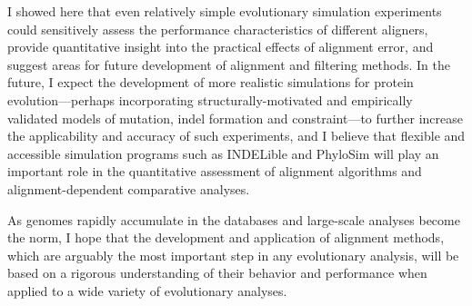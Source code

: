 
I showed here that even relatively simple evolutionary simulation
experiments could sensitively assess the performance characteristics
of different aligners, provide quantitative insight into the practical
effects of alignment error, and suggest areas for future development
of alignment and filtering methods. In the future, I expect the
development of more realistic simulations for protein
evolution---perhaps incorporating structurally-motivated and
empirically validated models of mutation, indel formation and
constraint---to further increase the applicability and accuracy of
such experiments, and I believe that flexible and accessible
simulation programs such as INDELible \citep{Fletcher2009INDELible}
and PhyloSim \citep{Sipos2011PhyloSim} will play an important role in
the quantitative assessment of alignment algorithms and
alignment-dependent comparative analyses.

As genomes rapidly accumulate in the databases and large-scale
analyses become the norm, I hope that the development and application
of alignment methods, which are arguably the most important step in
any evolutionary analysis, will be based on a rigorous understanding
of their behavior and performance when applied to a wide variety of
evolutionary analyses.
